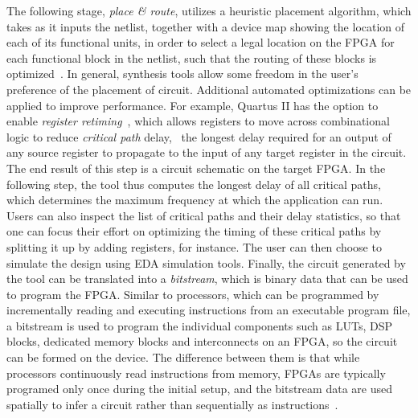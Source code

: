 The following stage, \emph{place \& route}, utilizes a heuristic placement
algorithm, which takes as it inputs the netlist, together with a device map
showing the location of each of its functional units, in order to select a
legal location on the FPGA for each functional block in the netlist, such
that the routing of these blocks is optimized~\cite{betz08}.  In general,
synthesis tools allow some freedom in the user's preference of the placement
of circuit.  Additional automated optimizations can be applied to improve
performance.  For example, Quartus II has the option to enable \emph{register
retiming}~\cite{quartus}, which allows registers to move across combinational
logic to reduce \emph{critical path} delay, \ie~the longest delay required
for an output of any source register to propagate to the input of any target
register in the circuit.  The end result of this step is a circuit schematic on
the target FPGA\@.  In the following step, the tool thus computes the longest
delay of all critical paths, which determines the maximum frequency at which
the application can run.  Users can also inspect the list of critical paths
and their delay statistics, so that one can focus their effort on optimizing
the timing of these critical paths by splitting it up by adding registers, for
instance.  The user can then choose to simulate the design using EDA simulation
tools.  Finally, the circuit generated by the tool can be translated into a
\emph{bitstream}, which is binary data that can be used to program the FPGA\@.
Similar to processors, which can be programmed by incrementally reading and
executing instructions from an executable program file, a bitstream is used to
program the individual components such as LUTs, DSP blocks, dedicated memory
blocks and interconnects on an FPGA, so the circuit can be formed on the
device.  The difference between them is that while processors continuously read
instructions from memory, FPGAs are typically programed only once during the
initial setup, and the bitstream data are used spatially to infer a circuit
rather than sequentially as instructions~\cite{guccione08}.
